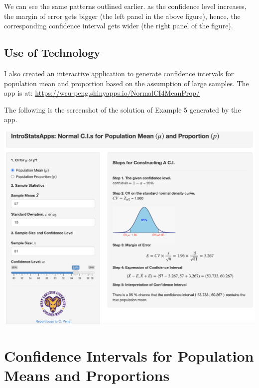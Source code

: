 \documentclass[
]{book}
\begin{document}
We can see the same patterns outlined earlier. as the confidence level increases, the margin of error gets bigger (the left panel in the above figure), hence, the corresponding confidence interval gets wider (the right panel of the figure).

\hfill\break

\hfill\break

\hypertarget{use-of-technology-4}{%
\section{Use of Technology}\label{use-of-technology-4}}

I also created an interactive application to generate confidence intervals for population mean and proportion based on the assumption of large samples. The app is at: \url{https://wcu-peng.shinyapps.io/NormalCI4MeanProp/}

\hfill\break

The following is the screenshot of the solution of Example 5 generated by the app.

\hfill\break

\hfill\break

\begin{center}\includegraphics[width=1\linewidth]{week06/ciNormalDemo} \end{center}

\hypertarget{confidence-intervals-for-population-means-and-proportions}{%
\chapter{Confidence Intervals for Population Means and Proportions}\label{confidence-intervals-for-population-means-and-proportions}}
\end{document}

